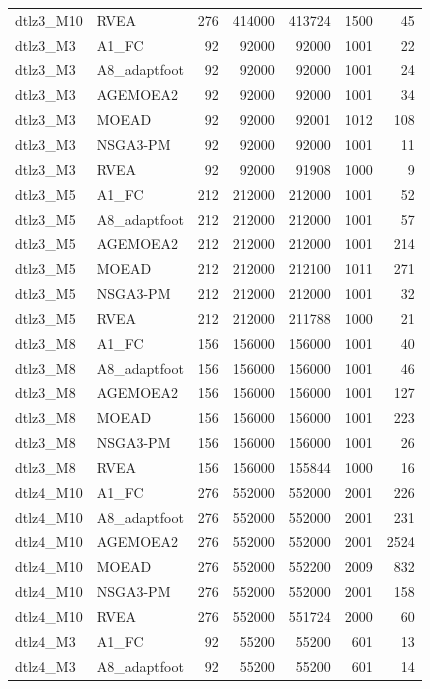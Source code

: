\begin{tabular}{llrrrrr}
dtlz3_M10 & RVEA & 276 & 414000 & 413724 & 1500 & 45 \\
dtlz3_M3 & A1_FC & 92 & 92000 & 92000 & 1001 & 22 \\
dtlz3_M3 & A8_adaptfoot & 92 & 92000 & 92000 & 1001 & 24 \\
dtlz3_M3 & AGEMOEA2 & 92 & 92000 & 92000 & 1001 & 34 \\
dtlz3_M3 & MOEAD & 92 & 92000 & 92001 & 1012 & 108 \\
dtlz3_M3 & NSGA3-PM & 92 & 92000 & 92000 & 1001 & 11 \\
dtlz3_M3 & RVEA & 92 & 92000 & 91908 & 1000 & 9 \\
dtlz3_M5 & A1_FC & 212 & 212000 & 212000 & 1001 & 52 \\
dtlz3_M5 & A8_adaptfoot & 212 & 212000 & 212000 & 1001 & 57 \\
dtlz3_M5 & AGEMOEA2 & 212 & 212000 & 212000 & 1001 & 214 \\
dtlz3_M5 & MOEAD & 212 & 212000 & 212100 & 1011 & 271 \\
dtlz3_M5 & NSGA3-PM & 212 & 212000 & 212000 & 1001 & 32 \\
dtlz3_M5 & RVEA & 212 & 212000 & 211788 & 1000 & 21 \\
dtlz3_M8 & A1_FC & 156 & 156000 & 156000 & 1001 & 40 \\
dtlz3_M8 & A8_adaptfoot & 156 & 156000 & 156000 & 1001 & 46 \\
dtlz3_M8 & AGEMOEA2 & 156 & 156000 & 156000 & 1001 & 127 \\
dtlz3_M8 & MOEAD & 156 & 156000 & 156000 & 1001 & 223 \\
dtlz3_M8 & NSGA3-PM & 156 & 156000 & 156000 & 1001 & 26 \\
dtlz3_M8 & RVEA & 156 & 156000 & 155844 & 1000 & 16 \\
dtlz4_M10 & A1_FC & 276 & 552000 & 552000 & 2001 & 226 \\
dtlz4_M10 & A8_adaptfoot & 276 & 552000 & 552000 & 2001 & 231 \\
dtlz4_M10 & AGEMOEA2 & 276 & 552000 & 552000 & 2001 & 2524 \\
dtlz4_M10 & MOEAD & 276 & 552000 & 552200 & 2009 & 832 \\
dtlz4_M10 & NSGA3-PM & 276 & 552000 & 552000 & 2001 & 158 \\
dtlz4_M10 & RVEA & 276 & 552000 & 551724 & 2000 & 60 \\
dtlz4_M3 & A1_FC & 92 & 55200 & 55200 & 601 & 13 \\
dtlz4_M3 & A8_adaptfoot & 92 & 55200 & 55200 & 601 & 14 \\

\end{tabular}
